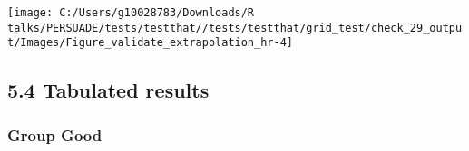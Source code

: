 \documentclass[
]{article}
\begin{document}
\begin{flushleft}\texttt{[image: C:/Users/g10028783/Downloads/R talks/PERSUADE/tests/testthat//tests/testthat/grid\_test/check\_29\_output/Images/Figure\_validate\_extrapolation\_hr-4]} \end{flushleft}

\clearpage

\subsection{5.4 Tabulated results}\label{tabulated-results}

\subsubsection{Group Good}\label{group-good}
\end{document}
